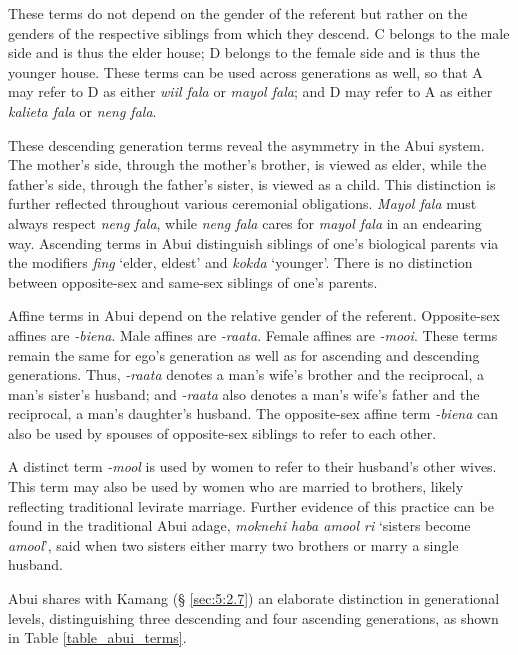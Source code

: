 These terms do not depend on the gender of the referent but rather on the genders of the respective siblings from which they descend. C belongs to the male side and is thus the elder house; D belongs to the female side and is thus the younger house. These terms can be used across generations as well, so that A may refer to D as either \textit{wiil fala} or \textit{mayol fala}; and D may refer to A as either \textit{kalieta fala} or \textit{neng fala}.

These descending generation terms reveal the asymmetry in the Abui system. The mother's side, through the mother's brother, is viewed as elder, while the father's side, through the father's sister, is viewed as a child. This distinction is further reflected throughout various ceremonial obligations. \textit{Mayol fala} must always respect \textit{neng fala}, while \textit{neng fala} cares for \textit{mayol fala} in an endearing way. Ascending terms in Abui distinguish siblings of one's biological parents via the modifiers \textit{fing} `elder, eldest' and \textit{kokda} `younger'. There is no distinction between opposite-sex and same-sex siblings of one's parents.

Affine terms in Abui depend on the relative gender of the referent. Opposite-sex affines are \textit{-biena}. Male affines are \textit{-raata}. Female affines are \textit{-mooi}. These terms remain the same for ego's generation as well as for ascending and descending generations. Thus, \textit{-raata} denotes a man's wife's brother and the reciprocal, a man's sister's husband; and \textit{-raata} also denotes a man's wife's father and the reciprocal, a man's daughter's husband. The opposite-sex affine term \textit{-biena} can also be used by spouses of opposite-sex siblings to refer to each other. 

A distinct term \textit{-mool} is used by women to refer to their husband's other wives. This term may also be used by women who are married to brothers, likely reflecting traditional levirate marriage. Further evidence of this practice can be found in the traditional Abui adage, \textit{moknehi haba amool ri} `sisters become \textit{amool}', said when two sisters either marry two brothers or marry a single husband. 

Abui shares with Kamang ({\S} \ref{sec:5:2.7}) an elaborate distinction in generational levels, distinguishing three descending and four ascending generations, as shown in Table \ref{table_abui_terms}.

